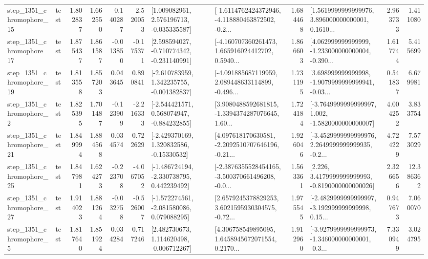 \begin{tabular}{llrrrrllrlrr}
 step\_1351\_chromophore\_15 &      test &      1.802837 &    1.662550 &     -0.140287 & -2.520053 &    [1.009082961, 2.576196713, -0.035335587] &  [-1.6114762424372946, -4.118880463872502, -0.2... &       1.684468 &  [1.5619999999999976, 3.896000000000001, 0.1610... &            2.963733 &          1.411080 \\
 step\_1351\_chromophore\_17 &      test &      1.875437 &    1.861587 &     -0.013850 & -0.175371 &   [2.598594027, -0.710774342, -0.231140991] &  [-4.160707360261473, 1.665916024412702, 0.5940... &       1.866603 &  [4.062999999999999, -1.233000000000004, -0.390... &            1.617744 &          5.415699 \\
 step\_1351\_chromophore\_19 &      test &      1.813558 &    1.857203 &      0.043645 &  0.890841 &   [-2.610783959, 1.342235755, -0.001382837] &  [-4.091885687119959, 2.089448633114899, -0.496... &       1.731195 &  [3.698999999999998, -1.9079999999999941, -0.03... &            0.541837 &          6.679981 \\
  step\_1351\_chromophore\_2 &      test &      1.825395 &    1.701487 &     -0.123909 & -2.216333 &   [-2.544421571, 0.568074947, -0.884232855] &  [3.9080488592681815, -1.3394374287076645, 1.60... &       1.724184 &  [-3.7649999999999997, 1.002, -1.5820000000000007] &            4.004252 &          3.833754 \\
 step\_1351\_chromophore\_21 &      test &      1.849994 &    1.884568 &      0.034574 &  0.722629 &    [-2.429370169, 1.320832586, -0.15330532] &  [4.097618170630581, -2.2092510707646196, -0.21... &       1.926046 &  [-3.4529999999999976, 2.2649999999999935, -0.2... &            4.724229 &          7.573029 \\
 step\_1351\_chromophore\_25 &      test &      1.847981 &    1.624273 &     -0.223708 & -4.067052 &   [-1.486724194, -2.330738795, 0.442239492] &  [-2.3876355528454165, -3.500370661496208, -0.0... &       1.563361 &   [2.226, 3.4179999999999993, -0.8190000000000026] &            2.326656 &         12.386362 \\
 step\_1351\_chromophore\_27 &      test &      1.914023 &    1.881264 &     -0.032758 & -0.526007 &   [-1.572274561, -2.081580086, 0.079088295] &  [2.6579245378829253, 3.6021595930304575, -0.72... &       1.975545 &  [-2.4829999999999997, -3.192999999999998, 0.15... &            0.947673 &          7.060070 \\
  step\_1351\_chromophore\_5 &      test &      1.817640 &    1.851924 &      0.034284 &  0.717246 &    [2.482730673, 1.114620498, -0.006712267] &  [4.306758549895095, 1.6458945672071554, 0.2170... &       1.912960 &  [-3.9279999999999973, -1.346000000000001, -0.3... &            7.330949 &          3.024795 \\

\end{tabular}
